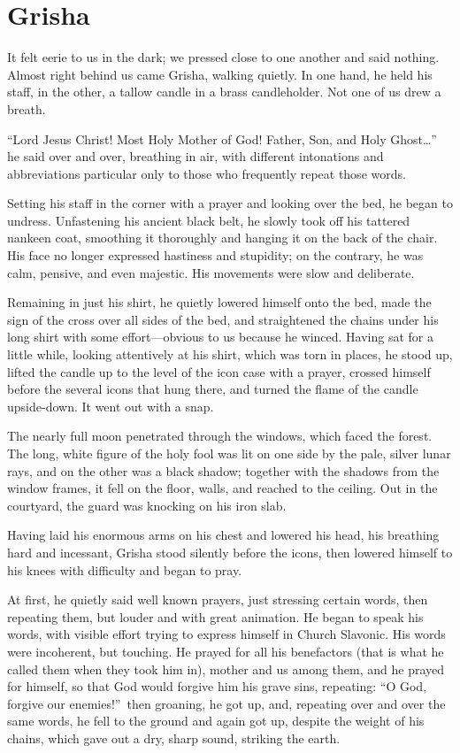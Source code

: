 \chapter{Grisha} %

It felt eerie to us in the dark; we pressed close to one another and said nothing. Almost right behind us came Grisha, walking quietly. In one hand, he held his staff, in the other, a tallow candle in a brass candleholder. Not one of us drew a breath.

``Lord Jesus Christ! Most Holy Mother of God! Father, Son, and Holy Ghost\ldots{}'' he said over and over, breathing in air, with different intonations and abbreviations particular only to those who frequently repeat those words.

Setting his staff in the corner with a prayer and looking over the bed, he began to undress. Unfastening his ancient black belt, he slowly took off his tattered nankeen coat, smoothing it thoroughly and hanging it on the back of the chair. His face no longer expressed hastiness and stupidity; on the contrary, he was calm, pensive, and even majestic. His movements were slow and deliberate.

Remaining in just his shirt, he quietly lowered himself onto the bed, made the sign of the cross over all sides of the bed, and straightened the chains under his long shirt with some effort---obvious to us because he winced. Having sat for a little while, looking attentively at his shirt, which was torn in places, he stood up, lifted the candle up to the level of the icon case with a prayer, crossed himself before the several icons that hung there, and turned the flame of the candle upside-down. It went out with a snap.

The nearly full moon penetrated through the windows, which faced the forest. The long, white figure of the holy fool was lit on one side by the pale, silver lunar rays, and on the other was a black shadow; together with the shadows from the window frames, it fell on the floor, walls, and reached to the ceiling. Out in the courtyard, the guard was knocking on his iron slab.

Having laid his enormous arms on his chest and lowered his head, his breathing hard and incessant, Grisha stood silently before the icons, then lowered himself to his knees with difficulty and began to pray.

At first, he quietly said well known prayers, just stressing certain words, then repeating them, but louder and with great animation. He began to speak his words, with visible effort trying to express himself in Church Slavonic. His words were incoherent, but touching. He prayed for all his benefactors (that is what he called them when they took him in), mother and us among them, and he prayed for himself, so that God would forgive him his grave sins, repeating: ``O God, forgive our enemies!''~then groaning, he got up, and, repeating over and over the same words, he fell to the ground and again got up, despite the weight of his chains, which gave out a dry, sharp sound, striking the earth.

